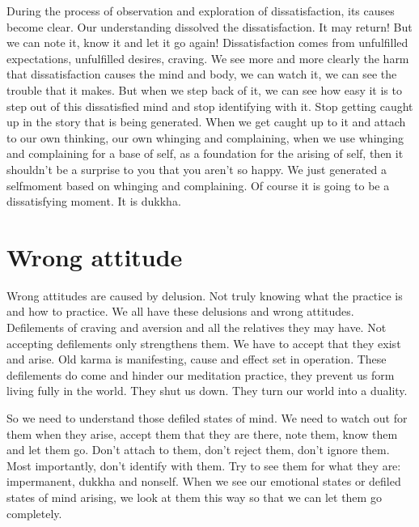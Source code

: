 \documentclass[letterpaper,10pt,english]{sphinxmanual}
\begin{document}
\sphinxAtStartPar
During the process of observation and exploration of dissatisfaction,
its causes become clear. Our understanding dissolved the dissatisfaction. It
may  return!  But  we  can  note  it,  know  it  and  let  it  go  again!  Dissatisfaction    comes  from  unfulfilled  expectations,  unfulfilled  desires,  craving.  We
see more and more clearly the harm that dissatisfaction causes the mind and
body, we can watch it, we can see the trouble that it makes. But when we
step back of it, we can see how easy it is to step out of this dissatisfied mind
and stop identifying with it. Stop getting caught up in the story that is being
generated. When we get caught up to it and attach to our own thinking, our
own  whinging  and  complaining,  when  we  use  whinging  and  complaining
for a base of self, as a foundation for the arising of self, then it shouldn’t be
a surprise to you that you aren’t so happy. We just generated a self\sphinxhyphen{}moment
based on whinging and complaining. Of course it is going to be a dissatisfying moment. It is dukkha.


\section{Wrong attitude}
\label{\detokenize{4-b:wrong-attitude}}
\sphinxAtStartPar
Wrong attitudes are caused by delusion. Not truly knowing what the
practice is and how to practice. We all have these delusions and wrong attitudes.  Defilements  of  craving  and  aversion  and  all  the  relatives  they  may
have. Not accepting defilements only strengthens them. We have to accept
that they exist and arise. Old karma is manifesting, cause and effect set in
operation. These  defilements  do  come  and  hinder  our  meditation  practice,
they prevent us form living fully in the world. They shut us down. They turn
our world into a duality.

\sphinxAtStartPar
So  we  need  to  understand  those  defiled  states  of  mind.  We  need  to
watch  out  for  them  when  they  arise,  accept  them  that  they  are  there,  note
them, know them and let them go. Don’t attach to them, don’t reject them,
don’t  ignore  them.  Most  importantly,  don’t  identify  with  them. Try  to  see
them  for  what  they  are:  impermanent,  dukkha  and  non\sphinxhyphen{}self. When  we  see
our emotional states or defiled states of mind arising, we look at them this
way so that we can let them go completely.
\end{document}

